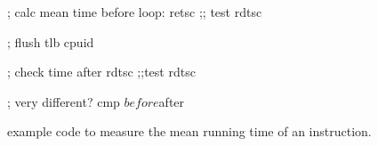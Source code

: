 \begin{figure}[h]
\begin{lstasm}
; calc mean time before
loop:
	retsc
	;; test
	rdtsc

; flush tlb
cpuid

; check time after
rdtsc
;;test
rdtsc

; very different? 
cmp $before $after
\end{lstasm}
\caption{\label{fig:cache_mitigation} example code to measure the mean running
  time of an instruction.}
\end{figure}


